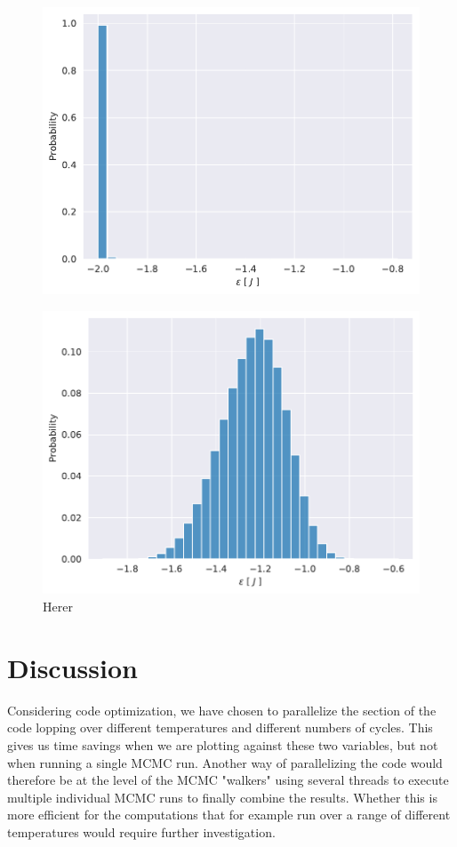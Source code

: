 \documentclass[english,notitlepage,reprint,nofootinbib]{revtex4-1}  %
\begin{document}
\begin{figure}[H]
    \centering
    \includegraphics[width=.5\textwidth]{../figures/histogram_T_1_m.pdf}
    \caption{   }
    \label{fig:}
\end{figure}

\begin{figure}[H]
    \centering
    \includegraphics[width=.5\textwidth]{../figures/histogram_T_2_4_m.pdf}
    \caption{Herer }
    \label{fig:}
\end{figure}




\section{Discussion}\label{sec:discussion}
%
Considering code optimization, we have chosen to parallelize the section of the code lopping over different temperatures and different numbers of cycles. This gives us time savings when we are plotting against these two variables, but not when running a single MCMC run. Another way of parallelizing the code would therefore be at the level of the MCMC "walkers" using several threads to execute multiple individual MCMC runs to finally combine the results. Whether this is more efficient for the computations that for example run over a range of different temperatures would require further investigation. 
\end{document}
